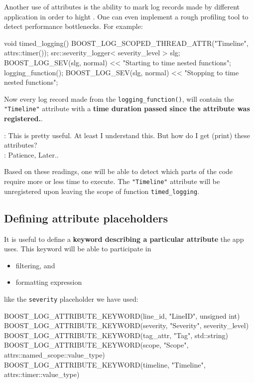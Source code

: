 \documentclass[dvipsnames]{article}
\let\emph\relax %
\begin{document}
Another use of attributes is the ability to mark log records made by different
application in order to hight \emph{activity related to a single process}. One
can even implement a rough profiling tool to detect performance bottlenecks. For
example:

\begin{simplec}
  void timed_logging(){
    BOOST_LOG_SCOPED_THREAD_ATTR("Timeline", attrs::timer());
    src::severity_logger< severity_level > slg;
    BOOST_LOG_SEV(slg, normal) << "Starting to time nested functions";
    logging_function();
    BOOST_LOG_SEV(slg, normal) << "Stopping to time nested functions";
  }
\end{simplec}
Now every log record made from the \verb|logging_function()|, will contain the
\texttt{"Timeline"} attribute with a \textbf{time duration passed since the
  attribute was registered.}.
\begin{tcolorbox}
   : This is pretty useful. At least I understand this. But how do
  I get (print) these attributes?\\
   : Patience, Later..
\end{tcolorbox}

Based on these readings, one will be able to detect which parts of the code
require more or less time to execute. The \texttt{"Timeline"} attribute will be
unregistered upon leaving the scope of function \verb|timed_logging|.

\subsection{Defining attribute placeholders}
\label{sec:def_attr_placeholders}


It is useful to define a \textbf{keyword describing a particular attribute} the
app uses. This keyword will be able to participate in
\begin{itemize}
\item filtering, and
\item formatting expression
\end{itemize}
like the \texttt{severity} placeholder we have used:
\begin{simplec}
  BOOST_LOG_ATTRIBUTE_KEYWORD(line_id, "LineID", unsigned int)
  BOOST_LOG_ATTRIBUTE_KEYWORD(severity, "Severity", severity_level)
  BOOST_LOG_ATTRIBUTE_KEYWORD(tag_attr, "Tag", std::string)
  BOOST_LOG_ATTRIBUTE_KEYWORD(scope, "Scope", attrs::named_scope::value_type)
  BOOST_LOG_ATTRIBUTE_KEYWORD(timeline, "Timeline", attrs::timer::value_type) 
\end{simplec}
\end{document}
